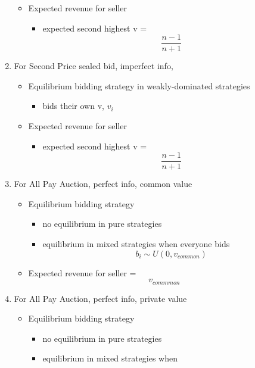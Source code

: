 \documentclass[10pt, a4paper]{article}
\begin{document}
\begin{enumerate}
\begin{itemize}
\begin{itemize}
             \end{itemize}
         \item Expected revenue for seller 
             \begin{itemize}
                \item expected second highest v = \[ \frac{n-1}{n+1}\]
             \end{itemize}
      \end{itemize}
   \item For Second Price sealed bid, imperfect info, 
      \begin{itemize}
         \item Equilibrium bidding strategy in weakly-dominated strategies
             \begin{itemize}
                \item bids their own v, $v_i$
             \end{itemize}
         \item Expected revenue for seller 
             \begin{itemize}
                \item expected second highest v = \[ \frac{n-1}{n+1}\]
             \end{itemize}
      \end{itemize}
   \item For All Pay Auction, perfect info, common value
      \begin{itemize}
         \item Equilibrium bidding strategy 
             \begin{itemize}
                \item no equilibrium in pure strategies 
                \item equilibrium in mixed strategies when everyone bids 
                   \[
                      b_i \sim U(0, v_{common})
                   \]
             \end{itemize}
          \item Expected revenue for seller = \[v_{commmon}\]
      \end{itemize}
   \item For All Pay Auction, perfect info, private value
      \begin{itemize}
         \item Equilibrium bidding strategy 
             \begin{itemize}
                \item no equilibrium in pure strategies 
                \item equilibrium in mixed strategies when  

\end{itemize}
\end{itemize}
\end{enumerate}
\end{document}
